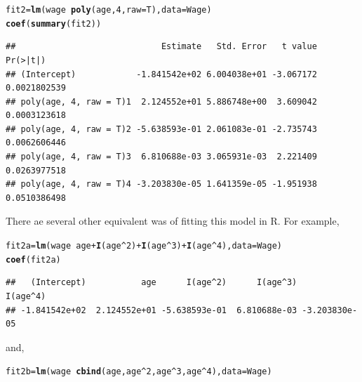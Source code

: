 \documentclass[12pt]{article}\usepackage[]{graphicx}\usepackage[]{color}
\makeatletter
\newcommand{\hlnum}[1]{\textcolor[rgb]{0.686,0.059,0.569}{#1}}%
\newcommand{\hlopt}[1]{\textcolor[rgb]{0,0,0}{#1}}%
\newcommand{\hlstd}[1]{\textcolor[rgb]{0.345,0.345,0.345}{#1}}%
\newcommand{\hlkwb}[1]{\textcolor[rgb]{0.69,0.353,0.396}{#1}}%
\newcommand{\hlkwc}[1]{\textcolor[rgb]{0.333,0.667,0.333}{#1}}%
\newcommand{\hlkwd}[1]{\textcolor[rgb]{0.737,0.353,0.396}{\textbf{#1}}}%
\newenvironment{kframe}{%
 \def\at@end@of@kframe{}%
 \ifinner\ifhmode%
  \def\at@end@of@kframe{\end{minipage}}%
  \begin{minipage}{\columnwidth}%
 \fi\fi%
 \def\FrameCommand##1{\hskip\@totalleftmargin \hskip-\fboxsep
 \colorbox{shadecolor}{##1}\hskip-\fboxsep
     \hskip-\linewidth \hskip-\@totalleftmargin \hskip\columnwidth}%
 \MakeFramed {\advance\hsize-\width
   \@totalleftmargin\z@ \linewidth\hsize
   \@setminipage}}%
 {\par\unskip\endMakeFramed%
 \at@end@of@kframe}
\newenvironment{knitrout}{}{} %
\makeatother
\begin{document}
\begin{knitrout}
\color{fgcolor}\begin{kframe}
\begin{alltt}
\hlstd{fit2}\hlkwb{=}\hlkwd{lm}\hlstd{(wage}\hlopt{~}\hlkwd{poly}\hlstd{(age,}\hlnum{4}\hlstd{,}\hlkwc{raw}\hlstd{=T),}\hlkwc{data}\hlstd{=Wage)}
\hlkwd{coef}\hlstd{(}\hlkwd{summary}\hlstd{(fit2))}
\end{alltt}
\begin{verbatim}
##                             Estimate   Std. Error   t value     Pr(>|t|)
## (Intercept)            -1.841542e+02 6.004038e+01 -3.067172 0.0021802539
## poly(age, 4, raw = T)1  2.124552e+01 5.886748e+00  3.609042 0.0003123618
## poly(age, 4, raw = T)2 -5.638593e-01 2.061083e-01 -2.735743 0.0062606446
## poly(age, 4, raw = T)3  6.810688e-03 3.065931e-03  2.221409 0.0263977518
## poly(age, 4, raw = T)4 -3.203830e-05 1.641359e-05 -1.951938 0.0510386498
\end{verbatim}
\end{kframe}
\end{knitrout}

There ae several other equivalent was of fitting this model in R. For example,

\begin{knitrout}
\color{fgcolor}\begin{kframe}
\begin{alltt}
\hlstd{fit2a} \hlkwb{=} \hlkwd{lm}\hlstd{(wage}\hlopt{~}\hlstd{age}\hlopt{+}\hlkwd{I}\hlstd{(age}\hlopt{^}\hlnum{2}\hlstd{)}\hlopt{+}\hlkwd{I}\hlstd{(age}\hlopt{^}\hlnum{3}\hlstd{)}\hlopt{+}\hlkwd{I}\hlstd{(age}\hlopt{^}\hlnum{4}\hlstd{),} \hlkwc{data}\hlstd{=Wage)}
\hlkwd{coef}\hlstd{(fit2a)}
\end{alltt}
\begin{verbatim}
##   (Intercept)           age      I(age^2)      I(age^3)      I(age^4) 
## -1.841542e+02  2.124552e+01 -5.638593e-01  6.810688e-03 -3.203830e-05
\end{verbatim}
\end{kframe}
\end{knitrout}

and,

\begin{knitrout}
\color{fgcolor}\begin{kframe}
\begin{alltt}
\hlstd{fit2b} \hlkwb{=} \hlkwd{lm}\hlstd{(wage}\hlopt{~}\hlkwd{cbind}\hlstd{(age, age}\hlopt{^}\hlnum{2}\hlstd{, age}\hlopt{^}\hlnum{3}\hlstd{, age}\hlopt{^}\hlnum{4}\hlstd{),} \hlkwc{data} \hlstd{= Wage)}
\end{alltt}
\end{kframe}
\end{knitrout}
\end{document}
